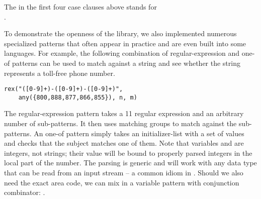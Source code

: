 \noindent
The  in the first four case clauses above stands for \\ %
. %

To demonstrate the openness of the library, we also implemented numerous 
specialized patterns that often appear in practice and are even built into some 
languages. For example, the following combination of regular-expression and one-of 
patterns can be used to match against a string and see whether the string 
represents a toll-free phone number. 

\begin{lstlisting}
rex("([0-9]+)-([0-9]+)-([0-9]+)", 
    any({800,888,877,866,855}), n, m)
\end{lstlisting}

\noindent
The regular-expression pattern takes a \Cpp{}11 regular expression and an 
arbitrary number of sub-patterns. It then uses matching groups to match against 
the sub-patterns. An one-of pattern simply takes an initializer-list with a set of 
values and checks that the subject matches one of them. Note that variables 
 and  are integers, not strings; their value will be bound to 
properly parsed integers in the local part of the number. The parsing is generic 
and will work with any data type that can be read from an input stream -- a 
common idiom in \Cpp{}. Should we also need the exact area code, we can mix in a 
variable pattern with conjunction combinator: .

